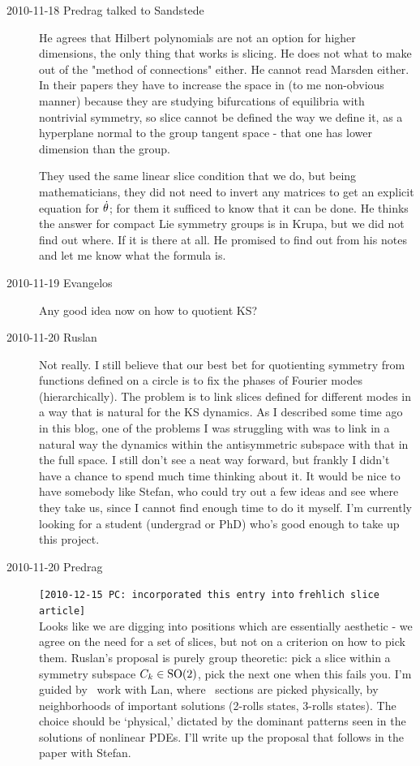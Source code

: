 \begin{description}
\item[2010-11-18 Predrag talked to Sandstede]
He agrees that Hilbert polynomials are not an option for higher dimensions,
the only thing that works is slicing. He does not what to make out
of the "method of connections" either. He cannot read Marsden either.
In their papers they have to increase the
space in (to me non-obvious manner) because they are studying
bifurcations of equilibria with nontrivial symmetry, so slice cannot be
defined the way we define it, as a hyperplane normal to the group tangent
space - that one has lower dimension than the group.

They used the same linear slice condition that we do, but being mathematicians,
they did not need to invert any matrices to get an explicit equation for
$\dot{\theta}$; for them it sufficed to know that it can be done.
He thinks the answer for compact Lie symmetry groups is in Krupa, but
we did not find out where. If it is there at all. He promised to find out
from his notes and let me know what the formula is.

\item[2010-11-19 Evangelos]
Any good idea now on how to quotient KS?

\item[2010-11-20 Ruslan]
Not really.  I still believe that our best bet for quotienting 
symmetry from functions defined on a circle is to fix the phases of
Fourier modes (hierarchically).  The problem is to link slices defined
for different modes in a way that is natural for the KS dynamics.  As I
described some time ago in this blog, one of the problems I was struggling
with was to link in a natural way the dynamics within the antisymmetric
subspace with that in the full space.  I still don't see a neat way
forward, but frankly I didn't have a chance to spend much time thinking
about it.  It would be nice to have somebody like Stefan, who could try
out a few ideas and see where they take us, since I cannot find enough
time to do it myself.  I'm currently looking for a student (undergrad or
PhD) who's good enough to take up this project.


\item[2010-11-20 Predrag]
\texttt{[2010-12-15 PC: incorporated this entry into}
 \texttt{frehlich slice article]}
\\
Looks like we are digging into positions which are essentially aesthetic
- we agree on the need for a set of slices, but not on a criterion on
how to pick them. Ruslan's proposal is purely group theoretic: pick a slice
within a symmetry subspace $C_k \in \textrm{SO}(2)$, pick the next one when this
fails you. I'm guided by \KS\ work with Lan, where \Poincare\ sections
are picked physically,
by neighborhoods of important solutions (2-rolls states, 3-rolls
states). The choice should be `physical,'
dictated by the dominant patterns seen in the solutions of
nonlinear PDEs.
I'll write up the proposal that follows
in the paper with Stefan.


\end{description}
